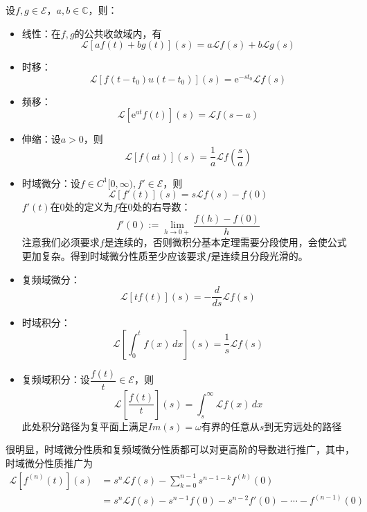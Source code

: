 \documentclass{ctexbook}
\begin{document}
\begin{proposition}[拉普拉斯变换的性质]
    设$f,g\in\mathcal{E} $，$a,b\in\mathbb{C}$，则：\begin{itemize}
        \item 线性：在$f,g$的公共收敛域内，有\[\mathcal{L} [af(t)+bg(t)](s)=a\mathcal{L} f(s)+b\mathcal{L} g(s)\]
        \item 时移：\[\mathcal{L} [f(t-t_0)u(t-t_0)](s)=\mathrm{e}^{-s t_0}\mathcal{L} f(s)\]
        \item 频移：\[\mathcal{L} [\mathrm{e}^{a t}f(t)](s)=\mathcal{L} f(s-a)\]
        \item 伸缩：设$a>0$，则\[\mathcal{L} [f(at)](s)=\frac{1}{a}\mathcal{L} f\left(\frac{s}{a}\right)\]
        \item 时域微分：设$f\in C^1[0,\infty),f'\in\mathcal{E} $，则\[\mathcal{L} [f'(t)](s)=s\mathcal{L} f(s)-f(0)\]
        $f'(t)$在0处的定义为$f$在0处的右导数：$$f'(0):=\lim_{h\to 0+}\dfrac{f(h)-f(0)}{h}$$
        注意我们必须要求$f$是连续的，否则微积分基本定理需要分段使用，会使公式更加复杂。得到时域微分性质至少应该要求$f$是连续且分段光滑的。
        \item 复频域微分：\[\mathcal{L} [t f(t)](s)=-\frac{d}{ds}\mathcal{L} f(s)\]
        \item 时域积分：\[\mathcal{L} \left[\int_0^t f(x)\,dx\right](s)=\frac{1}{s}\mathcal{L} f(s)\]
        \item 复频域积分：设$\dfrac{f(t)}{t}\in\mathcal{E} $，则\[\mathcal{L} \left[\frac{f(t)}{t}\right](s)=\int_s^{\infty}\mathcal{L}f(x)\,dx\]
        此处积分路径为复平面上满足$Im(s)=\omega$有界的任意从$s$到无穷远处的路径
    \end{itemize}
\end{proposition}
\begin{remark}
    很明显，时域微分性质和复频域微分性质都可以对更高阶的导数进行推广，其中，时域微分性质推广为\begin{align*}
\mathcal{L} [f^{(n)}(t)](s)&=s^n\mathcal{L} f(s)-\sum_{k=0}^{n-1}s^{n-1-k}f^{(k)}(0)\\
&=s^n\mathcal{L} f(s)-s^{n-1}f(0)-s^{n-2}f'(0)-\cdots -f^{(n-1)}(0)
\end{align*}
\end{remark}
\end{document}
